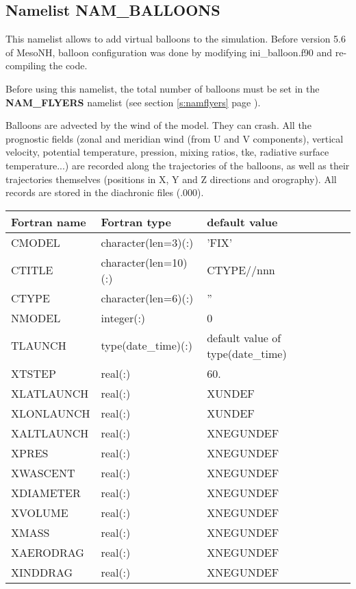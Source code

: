 \subsection{Namelist NAM\_BALLOONS }\label{s:namballoons}

This namelist allows to add virtual balloons to the simulation. Before version 5.6 of MesoNH, balloon configuration was done by modifying ini\_balloon.f90 and re-compiling the code.

Before using this namelist, the total number of balloons must be set in the \textbf{NAM\_FLYERS} namelist (see section \ref{s:namflyers} page \pageref{s:namflyers}).

Balloons are advected by the wind of the model. They can crash.
All the prognostic fields (zonal and meridian wind (from U and V components), vertical
velocity, potential temperature, pression, mixing ratios, tke, radiative surface temperature...) are
recorded along the trajectories of the balloons, as well as their trajectories themselves (positions
in X, Y and Z directions and orography). All records are stored in the diachronic files (.000).

\vspace{0.5cm}
\begin{longtable} {|p{}|p{}|p{}|}
\hline
Fortran name &  Fortran type & default value \\
\hline
\endhead
\hline
\endfoot
CMODEL      & character(len=3)(:)  & 'FIX' \\
CTITLE      & character(len=10)(:) & CTYPE//nnn \\
CTYPE       & character(len=6)(:)  & '' \\
NMODEL      & integer(:)           & 0 \\
TLAUNCH     & type(date\_time)(:)  & default value of type(date\_time) \\
XTSTEP      & real(:)              & 60. \\
XLATLAUNCH  & real(:)              & XUNDEF \\
XLONLAUNCH  & real(:)              & XUNDEF \\
XALTLAUNCH  & real(:)              & XNEGUNDEF \\
XPRES       & real(:)              & XNEGUNDEF \\
XWASCENT    & real(:)              & XNEGUNDEF \\
XDIAMETER   & real(:)              & XNEGUNDEF \\
XVOLUME     & real(:)              & XNEGUNDEF \\
XMASS       & real(:)              & XNEGUNDEF \\
XAERODRAG   & real(:)              & XNEGUNDEF \\
XINDDRAG    & real(:)              & XNEGUNDEF \\
\end{longtable}

